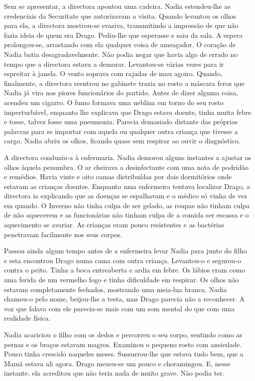 Sem se apresentar, a directora apontou uma cadeira. Nadia estendeu-lhe
as credenciais da Securitate que autorizavam a visita. Quando levantou
os olhos para ela, a directora mostrou-se evasiva, transmitindo a
impressão de que não fazia ideia de quem era Drago. Pediu-lhe que esperasse e saiu da sala. A espera prolongou-se, arrastando com ela qualquer
coisa de ameaçador. O coração de Nadia batia desagradavelmente. Não
podia negar que havia algo de errado no tempo que a directora estava a
demorar. Levantou-se várias vezes para ir espreitar à janela. O vento
soprava com rajadas de mau agoiro. Quando, finalmente, a directora
reentrou no gabinete trazia no rosto a máscara feroz que Nadia já vira
nos piores funcionários do partido. Antes de dizer alguma coisa, acendeu
um cigarro. O fumo formava uma neblina em torno do seu rosto
imperturbável, enquanto lhe explicava que Drago estava doente, tinha
muita febre e tosse, talvez fosse uma pneumonia. Parecia demasiado
distante das próprias palavras para se importar com aquela ou qualquer
outra criança que tivesse a cargo. Nadia abriu os olhos, ficando quase
sem respirar ao ouvir o diagnóstico.

A directora conduziu-a à enfermaria. Nadia demorou
alguns instantes a ajustar os olhos àquela penumbra. O ar cheirava a
desinfectante com uma nota de podridão e remédios. Havia vinte e oito
camas distribuídas por dois dormitórios onde estavam as crianças
doentes. Enquanto uma enfermeira tentava localizar Drago, a directora ia
explicando que as doenças se espalhavam e o médico só vinha de vez em
quando. O Inverno não tinha culpa de ser gelado, as roupas não tinham
culpa de não aquecerem e as funcionárias não tinham culpa de a comida
ser escassa e o aquecimento se avariar. As crianças eram pouco
resistentes e as bactérias penetravam facilmente nos seus corpos.

Passou ainda algum tempo antes de a enfermeira levar Nadia para junto do
filho e esta encontrou Drago numa
cama com outra criança. Levantou-o e segurou-o contra o peito. Tinha a
boca entreaberta e ardia em febre. Os lábios eram como uma ferida de um
vermelho fogo e tinha dificuldade em respirar. Os olhos não estavam
completamente fechados, mostrando uma meia-lua branca. Nadia chamou-o
pelo nome, beijou-lhe a testa, mas Drago parecia não a reconhecer. A voz
que falava com ele parecia-se mais com um som mental do que com uma
realidade física.

Nadia acariciou o filho com os dedos e percorreu o seu corpo, sentindo
como as pernas e os braços estavam magros. Examinou o pequeno rosto com
ansiedade. Pouco tinha crescido naqueles meses. Sussurrou-lhe que estava
tudo bem, que a Mamã estava ali agora. Drago mexeu-se um pouco e
choramingou. E, nesse instante, ela acreditou que não teria nada de
muito grave. Não podia ter.

